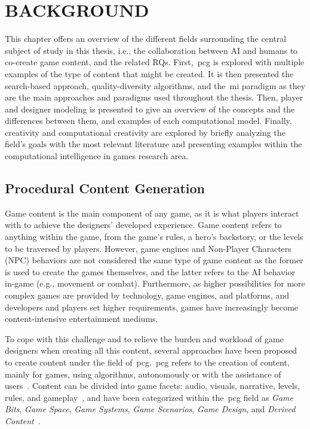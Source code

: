 \section{BACKGROUND} \normalfont \label{background}



This chapter offers an overview of the different fields surrounding the central subject of study in this thesis, i.e., the collaboration between AI and humans to co-create game content, and the related RQs. First,~\acrlong{pcg} is explored with multiple examples of the type of content that might be created. It is then presented the search-based approach, quality-diversity algorithms, and the~\acrlong{mi} paradigm as they are the main approaches and paradigms used throughout the thesis. Then, player and designer modeling is presented to give an overview of the concepts and the differences between them, and examples of each computational model. Finally, creativity and computational creativity are explored by briefly analyzing the field's goals with the most relevant literature and presenting examples within the computational intelligence in games research area.

\subsection{Procedural Content Generation}

Game content is the main component of any game, as it is what players interact with to achieve the designers' developed experience. Game content refers to anything within the game, from the game's rules, a hero's backstory, or the levels to be traversed by players. However, game engines and Non-Player Characters (NPC) behaviors are not considered the same type of game content as the former is used to create the games themselves, and the latter refers to the AI behavior in-game (e.g., movement or combat). Furthermore, as higher possibilities for more complex games are provided by technology, game engines, and platforms, and developers and players set higher requirements, games have increasingly become content-intensive entertainment mediums. 

To cope with this challenge and to relieve the burden and workload of game designers when creating all this content, several approaches have been proposed to create content under the field of~\acrlong{pcg}.~\acrshort{pcg} refers to the creation of content, mainly for games, using algorithms, autonomously or with the assistance of users~\cite{yannakakis_artificial_2018}. Content can be divided into game facets: audio, visuals, narrative, levels, rules, and gameplay~\cite{liapis_orchestrating_2019}, and have been categorized within the~\acrshort{pcg} field as \textit{Game Bits}, \textit{Game Space}, \textit{Game Systems}, \textit{Game Scenarios}, \textit{Game Design}, and \textit{Derived Content}~\cite{hendrikx_procedural_2013}.


